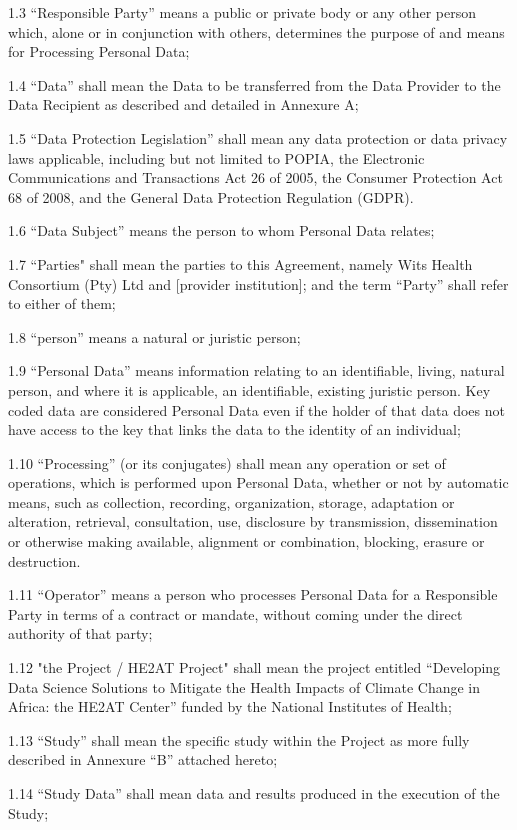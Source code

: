 \documentclass[12pt,letterpaper]{article}
\begin{document}
1.3	“Responsible Party” means a public or private body or any other person which, alone or in conjunction with others, determines the purpose of and means for Processing Personal Data;

1.4	 “Data” shall mean the Data to be transferred from the Data Provider to the Data Recipient as described and detailed in Annexure A;

1.5	“Data Protection Legislation” shall mean any data protection or data privacy laws applicable, including but not limited to POPIA, the Electronic Communications and Transactions Act 26 of 2005, the Consumer Protection Act 68 of 2008, and the General Data Protection Regulation (GDPR).

1.6	“Data Subject” means the person to whom Personal Data relates;

1.7	“Parties" shall mean the parties to this Agreement, namely Wits Health Consortium (Pty) Ltd and [provider institution]; and the term “Party” shall refer to either of them;

1.8	“person” means a natural or juristic person;

1.9	“Personal Data” means information relating to an identifiable, living, natural person, and where it is applicable, an identifiable, existing juristic person. Key coded data are considered Personal Data even if the holder of that data does not have access to the key that links the data to the identity of an individual;	

1.10	“Processing” (or its conjugates) shall mean any operation or set of operations, which is performed upon Personal Data, whether or not by automatic means, such as collection, recording, organization, storage, adaptation or alteration, retrieval, consultation, use, disclosure by transmission, dissemination or otherwise making available, alignment or combination, blocking, erasure or destruction.

1.11	“Operator” means a person who processes Personal Data for a Responsible Party in terms of a contract or mandate, without coming under the direct authority of that party;

1.12	"the Project / HE2AT Project" shall mean the project entitled “Developing Data Science Solutions to Mitigate the Health Impacts of Climate Change in Africa: the HE2AT Center” funded by the National Institutes of Health;

1.13	“Study” shall mean the specific study within the Project as more fully described in Annexure “B” attached hereto;

1.14	“Study Data” shall mean data and results produced in the execution of the Study; 
\end{document}
